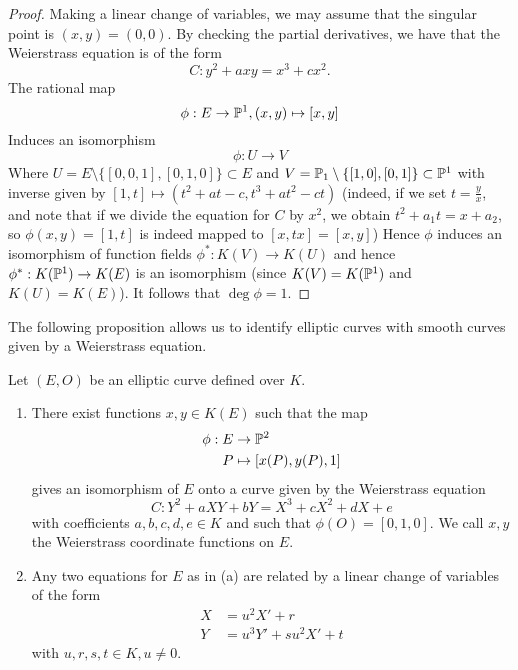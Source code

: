 \begin{proof}
	Making a linear change of variables, we may assume that the singular point
	is $(x, y) = (0, 0)$. By checking the partial derivatives, we have that
	the Weierstrass equation is of the form
	\begin{equation*}
		C: y^2 + axy = x^3 + cx^2.
	\end{equation*}
	The rational map
	\begin{equation*}
		\phi: E \to \mathbb{P}^1, (x, y) \mapsto [x, y]
	\end{equation*}
	Induces an isomorphism
	\begin{equation*}
		\phi: U \to V
	\end{equation*}
	Where $U = E\setminus\{[0, 0, 1], [0, 1, 0]\} \subset E$
	and $V = \mathbb{P}_1\setminus\{[1, 0], [0, 1]\} \subset \mathbb{P}^1$
	with inverse given by $[1, t]\mapsto(t^2 + at - c, t^3 + at^2 - ct)$
	(indeed, if we set $t = \frac{y}{x}$, and note that if we divide the
	equation for $C$ by $x^2$, we obtain $t^2 + a_1t = x+ a_2$, so
	$\phi(x, y) = [1, t]$ is indeed mapped to $[x, tx] = [x, y]$)
	Hence $\phi$ induces an isomorphism of function fields
	$\phi^*: K(V) \to K(U)$ and hence
	$\phi^*: K(\mathbb{P}^1) \to K(E)$ is an isomorphism 
	(since $K(V) = K(\mathbb{P}^1)$ and $K(U) = K(E)$).
	It follows that $\deg\phi = 1$.
\end{proof}


The following proposition allows us to identify elliptic curves
with smooth curves given by a Weierstrass equation.
\begin{proposition}
	\label{prop:curve-correspondence}
	Let $(E, O)$ be an elliptic curve defined over $K$.
	\begin{enumerate}[itemsep=0em, label=(\alph*)]
		\item There exist functions $x, y \in K(E)$ such that the map
			\begin{align*}
				\phi: E &\to \mathbb{P}^2\\
				P &\mapsto [x(P), y(P), 1]
			\end{align*}
			gives an isomorphism of $E$  onto a curve given by 
			the Weierstrass equation
			\begin{equation*}
				C: Y^2 + aXY + bY = X^3 + cX^2 + dX + e
			\end{equation*}
			with coefficients $a, b, c, d, e \in K$ and such that $\phi(O) =
			[0,1, 0]$. We call $x, y$ the Weierstrass coordinate functions
			on $E$.
		\item Any two equations for $E$ as in (a) are related by a linear change
			of variables of the form
			\begin{align*}
				X &= u^2X' + r\\
				Y &= u^3Y' + su^2X' + t
			\end{align*}
			with $u, r, s, t \in K, u \neq 0$.
	\end{enumerate}
\end{proposition}

